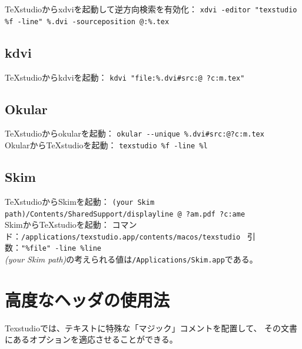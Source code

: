 TeXstudioからxdviを起動して逆方向検索を有効化：
 \texttt{xdvi -editor "texstudio \%f -line" \%.dvi -sourceposition @:\%.tex}

\subsection{kdvi}

TeXstudioからkdviを起動：
 \texttt{kdvi "file:\%.dvi\#src:@ ?c:m.tex"}

\subsection{Okular}

TeXstudioからokularを起動：
 \verb+okular --unique %.dvi#src:@?c:m.tex+\\

OkularからTeXstudioを起動： \verb+texstudio %f -line %l+

\subsection{Skim}

TeXstudioからSkimを起動：
 \texttt{(your Skim path)/Contents/SharedSupport/displayline @ ?am.pdf ?c:ame}\\

SkimからTeXstudioを起動：
コマンド：\verb+/applications/texstudio.app/contents/macos/texstudio+
\ 引数：\verb+"%file" -line %line+\\

\emph{(your Skim path)}の考えられる値は\verb+/Applications/Skim.app+である。

\section{高度なヘッダの使用法}\label{sec:magiccomment}

Texstudioでは、テキストに特殊な「マジック」コメントを配置して、
その文書にあるオプションを適応させることができる。

